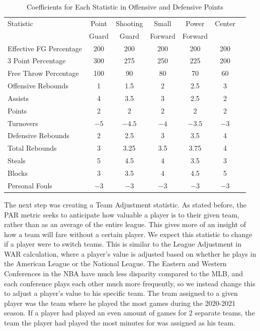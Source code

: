 \documentclass[titlepage, 12pt]{article}
\begin{document}
\begin{table}[tbp]
  \caption{Coefficients for Each Statistic in Offensive and Defensive Points}
  \label{tab:Coefficientstable}
\centering
\begin{tabular}[t]{lcccccc}
  \toprule
  Statistic & Point & Shooting & Small & Power  & Center\\
  & Guard & Guard & Forward & Forward & \\
  \midrule
 Effective FG Percentage & 200 & 200 & 200 & 200 & 200\\
 3 Point Percentage & 300 & 275 & 250 & 225 & 200\\
 Free Throw Percentage & 100 & 90 & 80 & 70 & 60\\
 Offensive Rebounds & 1 & 1.5 & 2 & 2.5 & 3\\
 Assists & 4 & 3.5 & 3 & 2.5 & 2\\
 Points & 2 & 2 & 2 & 2 & 2\\
 Turnovers & $-5$ & $-4.5$ & $-4$ & $-3.5$ & $-3$\\
 Defensive Rebounds & 2 & 2.5 & 3 & 3.5 & 4\\
 Total Rebounds & 3 & 3.25 & 3.5 & 3.75 & 4\\
 Steals & 5 & 4.5 & 4 & 3.5 & 3\\
 Blocks & 3 & 3.5 & 4 & 4.5 & 5\\
 Personal Fouls & $-3$ & $-3$ & $-3$ & $-3$ & $-3$\\
  \bottomrule
\end{tabular}
\end{table}

The next step was creating a Team Adjustment statistic. As stated before, 
the PAR metric seeks to 
anticipate how valuable a player is to their given team, rather than as an 
average of the entire league. This 
gives more of an insight of how a team will fare without a certain player. 
We expect this statistic to change if 
a player were to switch teams. This is similar to the League Adjustment in 
WAR calculation, where a 
player's value is adjusted based on whether he plays in the American 
League or the National League. The 
Eastern and Western Conferences in the NBA have much less disparity 
compared to the MLB, and each 
conference plays each other much more frequently, so we instead change 
this to adjust a player's value to 
his specific team. The team assigned to a given player was the team 
where he played the most games 
during the 2020-2021 season. If a player had played an even amount of 
games for 2 separate teams, the 
team the player had played the most minutes for was assigned as his 
team. 
\end{document}
